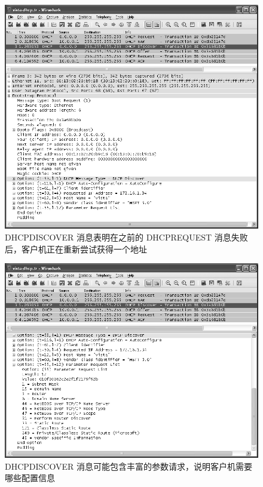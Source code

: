 \begin{figure}[H]
  \centering
  \includegraphics[scale=0.5]{imgs/6/6-5.png}
  \caption{DHCPDISCOVER 消息表明在之前的 DHCPREQUEST 消息失败后，客户机正在重新尝试获得一个地址}
\end{figure}

\begin{figure}[H]
  \centering
  \includegraphics[scale=0.5]{imgs/6/6-6.png}
  \caption{DHCPDISCOVER 消息可能包含丰富的参数请求，说明客户机需要哪些配置信息}
\end{figure}

